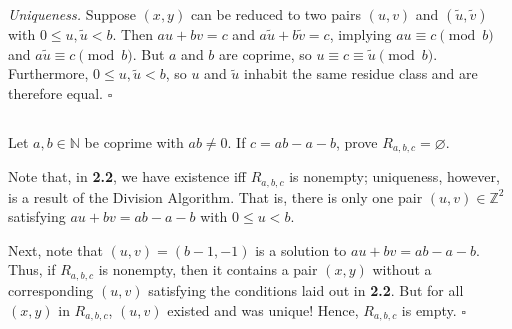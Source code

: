 \documentclass{article}
\newcommand{\N}{\mathbb{N}}
\newcommand{\Z}{\mathbb{Z}}
\begin{document}
  \textit{Uniqueness.}
  Suppose $(x,y)$ can be reduced to two pairs $(u,v)$ and $(\tilde{u},
  \tilde{v})$ with $0\leq u,\tilde{u}<b$. Then $au+bv=c$ and $a\tilde{u}+b
  \tilde{v}=c$, implying $au\equiv c\pmod{b}$ and $a\tilde{u}\equiv c\pmod{b}$.
  But $a$ and $b$ are coprime, so $u\equiv c\equiv\tilde{u}\pmod{b}$.
  Furthermore, $0\leq u,\tilde{u}<b$, so $u$ and $\tilde{u}$ inhabit the same
  residue class and are therefore equal.
  \hfill $\square$

\subsection{} %
  Let $a,b\in\N$ be coprime with $ab\ne0$. If $c=ab-a-b$, prove $R_{a,b,c}=
  \varnothing$.



  Note that, in \textbf{2.2}, we have existence iff $R_{a,b,c}$ is nonempty;
  uniqueness, however, is a result of the Division Algorithm. That is, there is
  only one pair $(u,v)\in\Z^2$ satisfying $au+bv=ab-a-b$ with $0\leq u<b$.

  Next, note that $(u,v)=(b-1,-1)$ is a solution to $au+bv=ab-a-b$. Thus, if
  $R_{a,b,c}$ is nonempty, then it contains a pair $(x,y)$ without a
  corresponding $(u,v)$ satisfying the conditions laid out in \textbf{2.2}. But
  for all $(x,y)$ in $R_{a,b,c}$, $(u,v)$ existed and was unique! Hence,
  $R_{a,b,c}$ is empty.
  \hfill $\square$


\subsection{} %
\subsection{} %
\subsection{} %
\end{document}
